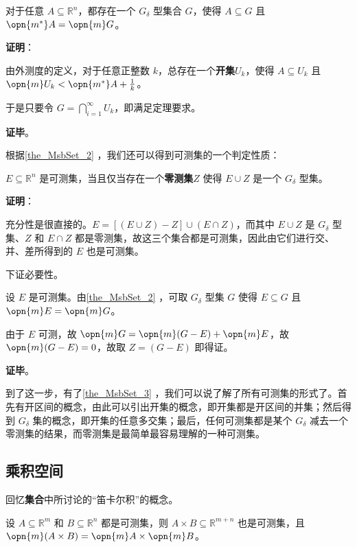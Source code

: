 \begin{theorem}{}\label{the_MsbSet_2}
对于任意 $A\subseteq \mathbb{R}^n$，都存在一个 $G_\delta$ 型集合 $G$，使得 $A\subseteq G$ 且 $\opn{m^*}A=\opn{m}G$。
\end{theorem}

\textbf{证明}：

由外测度的定义，对于任意正整数 $k$，总存在一个\textbf{开集}$U_k$，使得 $A\subseteq U_k$ 且 $\opn{m}U_k<\opn{m^*}A+\frac{1}{k}$。

于是只要令 $G=\bigcap_{i=1}^\infty U_k$，即满足定理要求。

\textbf{证毕}。








根据\autoref{the_MsbSet_2} ，我们还可以得到可测集的一个判定性质：

\begin{theorem}{}\label{the_MsbSet_3}
$E\subseteq \mathbb{R}^n$ 是可测集，当且仅当存在一个\textbf{零测集}$Z$ 使得 $E\cup Z$ 是一个 $G_\delta$ 型集。
\end{theorem}

\textbf{证明}：

充分性是很直接的。$E=[(E\cup Z)-Z]\cup(E\cap Z)$，而其中 $E\cup Z$ 是 $G_\delta$ 型集、$Z$ 和 $E\cap Z$ 都是零测集，故这三个集合都是可测集，因此由它们进行交、并、差所得到的 $E$ 也是可测集。

下证必要性。

设 $E$ 是可测集。由\autoref{the_MsbSet_2} ，可取 $G_\delta$ 型集 $G$ 使得 $E\subseteq G$ 且 $\opn{m}E=\opn{m}G$。

由于 $E$ 可测，故 $\opn{m}G=\opn{m}(G-E)+\opn{m}E$，故 $\opn{m}(G-E)=0$，故取 $Z=(G-E)$ 即得证。

\textbf{证毕}。

到了这一步，有了\autoref{the_MsbSet_3} ，我们可以说了解了所有可测集的形式了。首先有开区间的概念，由此可以引出开集的概念，即开集都是开区间的并集；然后得到 $G_\delta$ 集的概念，即开集的任意多交集；最后，任何可测集都是某个 $G_\delta$ 减去一个零测集的结果，而零测集是最简单最容易理解的一种可测集。


\subsection{乘积空间}

回忆\textbf{集合}中所讨论的“笛卡尔积”的概念。

\begin{theorem}{}
设 $A\subseteq\mathbb{R}^m$ 和 $B\subseteq\mathbb{R}^n$ 都是可测集，则 $A\times B \subseteq \mathbb{R}^{m+n}$ 也是可测集，且 $\opn{m}(A\times B)=\opn{m}A\times \opn{m}B$。
\end{theorem}

